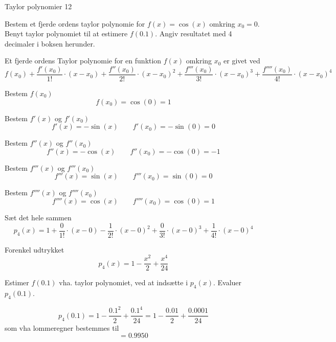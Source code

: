 \documentclass{article}
\begin{document}
\begin{exercise}{Taylor polynomier 12}

Bestem et fjerde ordens taylor polynomie for $f(x) =\cos(x)$
omkring $x_0 = 0$.
Benyt taylor polynomiet til at estimere $f(0.1)$.
Angiv resultatet med 4 decimaler i boksen herunder.

\hint
Et fjerde ordens Taylor polynomie for en funktion $f(x)$
omkring $x_0$ er givet ved
\[
f(x_0) + \frac{f'(x_0)}{1!} \cdot (x - x_0)
+ \frac{f''(x_0)}{2!} \cdot (x - x_0)^2
+ \frac{f'''(x_0)}{3!} \cdot (x - x_0)^3
+ \frac{f''''(x_0)}{4!} \cdot (x - x_0)^4
\]


\hint
Bestem $f(x_0)$
\[
f(x_0) = \cos(0) = 1
\]

\hint
Bestem $f'(x)$ og $f'(x_0)$
\[
f'(x) = - \sin(x) \qquad f'(x_0)= - \sin(0) = 0
\]

\hint
Bestem $f''(x)$ og $f''(x_0)$
\[
f''(x) = - \cos(x) \qquad f''(x_0) = - \cos(0) = -1
\]

\hint
Bestem $f'''(x)$ og $f'''(x_0)$
\[
f'''(x) = \sin(x) \qquad f'''(x_0) = \sin(0) = 0
\]

\hint
Bestem $f''''(x)$ og $f''''(x_0)$
\[
f''''(x) = \cos(x) \qquad f''''(x_0) = \cos(0) = 1
\]

\hint
Sæt det hele sammen
\[
p_4(x) = 1 + \frac{0}{1!} \cdot (x - 0) - \frac{1}{2!} \cdot (x - 0)^2 + \frac{0}{3!} \cdot (x - 0)^3+ \frac{1}{4!} \cdot (x - 0)^4
\]

\hint
Forenkel udtrykket
\[
p_4(x) = 1 - \frac{x^2}{2} + \frac{x^4}{24}
\]

\hint
Estimer $f(0.1)$ vha. taylor polynomiet, ved at indsætte i $p_4(x)$.
Evaluer $p_4(0.1)$.

\hint
\[
p_4(0.1) = 1 - \frac{0.1^2}{2} + \frac{0.1^4}{24} = 1 - \frac{0.01}{2} + \frac{0.0001}{24}
\]
som vha lommeregner bestemmes til
\[
= 0.9950
\]
\end{exercise}
\end{document}
